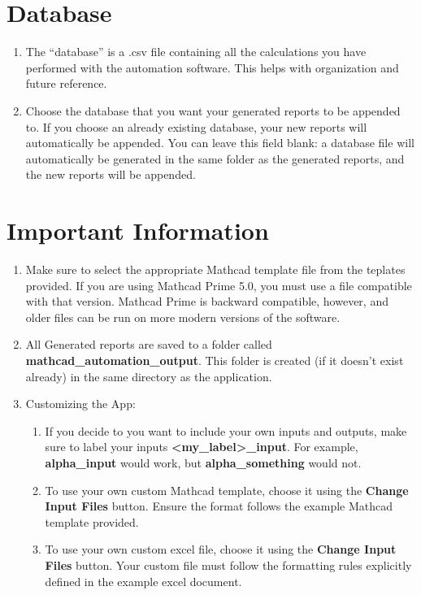 \documentclass[11pt]{article}
\begin{document}
\section{Database}
\label{sec:orge68dde4}
\begin{enumerate}
\item The ``database'' is a .csv file containing all the calculations you have performed with the automation software. This helps with organization and future reference.
\item Choose the database that you want your generated reports to be appended to. If you choose an already existing database, your new reports will automatically be appended. You can leave this field blank: a database file will automatically be generated in the same folder as the generated reports, and the new reports will be appended.
\end{enumerate}
\section{Important Information}
\label{sec:org82c3749}
\begin{enumerate}
\item Make sure to select the appropriate Mathcad template file from the teplates provided. If you are using Mathcad Prime 5.0, you must use a file compatible with that version. Mathcad Prime is backward compatible, however, and older files can be run on more modern versions of the software.
\item All Generated reports are saved to a folder called \textbf{mathcad\_automation\_output}. This folder is created (if it doesn't exist already) in the same directory as the application.
\item Customizing the App:
\begin{enumerate}
\item If you decide to you want to include your own inputs and outputs, make sure to label your inputs \textbf{<my\_label>\_input}. For example, \textbf{alpha\_input} would work, but \textbf{alpha\_something} would not.
\item To use your own custom Mathcad template, choose it using the \textbf{Change Input Files} button. Ensure the format follows the example Mathcad template provided.
\item To use your own custom excel file, choose it using the \textbf{Change Input Files} button. Your custom file must follow the formatting rules explicitly defined in the example excel document.
\end{enumerate}
\end{enumerate}
\end{document}
